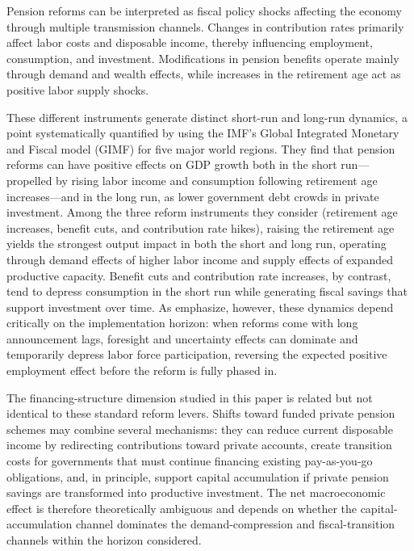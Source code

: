 \documentclass[11pt,english,a4paper, twoside, authoryear]{article}
\begin{document}
Pension reforms can be interpreted as fiscal policy shocks affecting the economy through multiple transmission channels. Changes in contribution rates primarily affect labor costs and disposable income, thereby influencing employment, consumption, and investment. Modifications in pension benefits operate mainly through demand and wealth effects, while increases in the retirement age act as positive labor supply shocks.

These different instruments generate distinct short-run and long-run dynamics, a point systematically quantified by \citet{KaramMuirPereiraTuladhar2010} using the IMF's Global Integrated Monetary and Fiscal model (GIMF) for five major world regions. They find that pension reforms can have positive effects on GDP growth both in the short run---propelled by rising labor income and consumption following retirement age increases---and in the long run, as lower government debt crowds in private investment. Among the three reform instruments they consider (retirement age increases, benefit cuts, and contribution rate hikes), raising the retirement age yields the strongest output impact in both the short and long run, operating through demand effects of higher labor income and supply effects of expanded productive capacity. Benefit cuts and contribution rate increases, by contrast, tend to depress consumption in the short run while generating fiscal savings that support investment over time. As \citet{BiZubairy2023} emphasize, however, these dynamics depend critically on the implementation horizon: when reforms come with long announcement lags, foresight and uncertainty effects can dominate and temporarily depress labor force participation, reversing the expected positive employment effect before the reform is fully phased in.

The financing-structure dimension studied in this paper is related but not identical to these standard reform levers. Shifts toward funded private pension schemes may combine several mechanisms: they can reduce current disposable income by redirecting contributions toward private accounts, create transition costs for governments that must continue financing existing pay-as-you-go obligations, and, in principle, support capital accumulation if private pension savings are transformed into productive investment. The net macroeconomic effect is therefore theoretically ambiguous and depends on whether the capital-accumulation channel dominates the demand-compression and fiscal-transition channels within the horizon considered.
\end{document}
